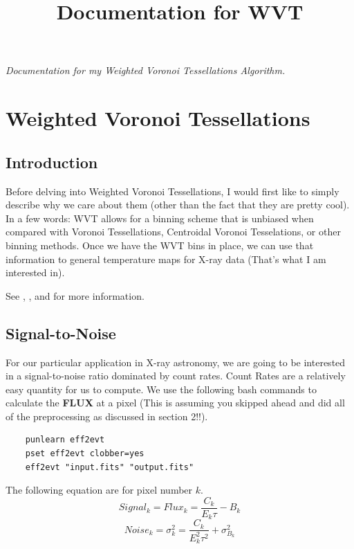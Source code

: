 \documentclass[11pt,letterpaper]{article}
\begin{document}
\univlogo

\title{Documentation for WVT}

\textit{Documentation for my Weighted Voronoi Tessellations Algorithm.}

\tableofcontents

\newpage


\newpage
\section{Weighted Voronoi Tessellations}

\subsection{Introduction}
Before delving into Weighted Voronoi Tessellations, I would first like to simply describe why we care about them (other than the fact that they are pretty cool). In a few words: WVT allows for a binning scheme that is unbiased when compared with Voronoi Tessellations, Centroidal Voronoi Tesselations, or other binning methods. Once we have the WVT bins in place, we can use that information to general temperature maps for X-ray data (That's what I am interested in).

See \cite{Copin2018}, \cite{Diehl2008}, and \cite{Sanders2018} for more information.
\subsection{Signal-to-Noise}
For our particular application in X-ray astronomy, we are going to be interested in a signal-to-noise ratio dominated by count rates. Count Rates are a relatively easy quantity for us to compute. We use the following bash commands to calculate the \textbf{FLUX} at a pixel (This is assuming you skipped ahead and did all of the preprocessing as discussed in section 2!!).
\begin{lstlisting}
	punlearn eff2evt
	pset eff2evt clobber=yes
	eff2evt "input.fits" "output.fits"
\end{lstlisting}

The following equation are for pixel number $k$.
\begin{equation}\label{eqn:signal}
	Signal_k = Flux_k = \frac{C_k}{E_k \tau}-B_k
\end{equation}
\begin{equation}\label{eqn:noise}
	Noise_k = \sigma^2_k = \frac{C_k}{E^2_k\tau^2}+\sigma^2_{B_k}
\end{equation}
\end{document}
